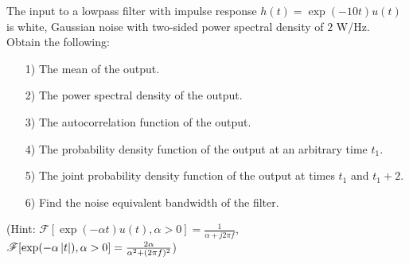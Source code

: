 \documentclass{assignment}
\begin{document}
\begin{prob}
    The input to a lowpass filter with impulse response $h(t)=\exp(-10t)u(t)$ is white, Gaussian noise with two-sided power spectral density of $2$ W/Hz. Obtain the following:
    \begin{itemize}
        \item[1)] The mean of the output.
        \item[2)] The power spectral density of the output.
        \item[3)] The autocorrelation function of the output.
        \item[4)] The probability density function of the output at an arbitrary time $t_1$.
        \item[5)] The joint probability density function of the output at times $t_1$ and $t_1+2$.
        \item[6)] Find the noise equivalent bandwidth of the filter.
    \end{itemize}
    (Hint: $\mathscr{F}[\exp(-\alpha t)u(t),\alpha>0]=\frac{1}{\alpha+j2\pi f}$, $\mathscr{F}[\exp(-\alpha\left\lvert t\right\rvert),\alpha>0]=\frac{2\alpha}{\alpha^2+(2\pi f)^2}$)
\end{prob}
\end{document}
